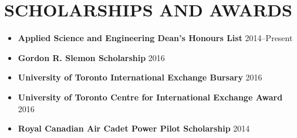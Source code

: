 \documentclass{ResumeTemplate}
\begin{document}
\begin{minipage}[c]{0.65\linewidth}
        \section{SCHOLARSHIPS AND AWARDS}
        \begin{itemize}[noitemsep, leftmargin=*]
            \item \textbf{Applied Science and Engineering Dean's Honours List} \hfill 2014--Present
            \item \textbf{Gordon R. Slemon Scholarship} \hfill 2016
            \item \textbf{University of Toronto International Exchange Bursary} \hfill 2016
            \item \textbf{University of Toronto Centre for International Exchange Award} \hfill 2016
            \item \textbf{Royal Canadian Air Cadet Power Pilot Scholarship} \hfill 2014
        \end{itemize}

    \end{minipage}
    \hspace{0.01\linewidth}
\end{document}
